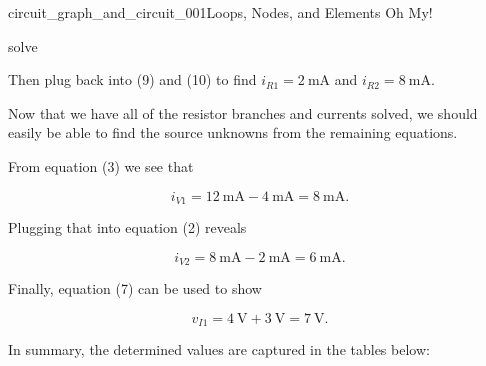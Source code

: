\begin{mainquestion}{circuit_graph_and_circuit_001}{Loops, Nodes, and Elements Oh My!}
\begin{partquestion}{solve}
\begin{answer}
Then plug back into (9) and (10) to find
$i_{R1}=\qty{2}{\milli\ampere}$ and
$i_{R2}=\qty{8}{\milli\ampere}$.

Now that we have all of the resistor branches and currents solved, we should easily be able to find the source unknowns from the remaining equations.

From equation (3) we see that

\[
i_{V1}
=
\qty{12}{\milli\ampere}
-
\qty{4}{\milli\ampere}
=
\qty{8}{\milli\ampere}.
\]

Plugging that into equation (2) reveals

\[
i_{V2}
=
\qty{8}{\milli\ampere}
-
\qty{2}{\milli\ampere}
=
\qty{6}{\milli\ampere}.
\]

Finally, equation (7) can be used to show

\[
v_{I1}
=
\qty{4}{\volt}
+
\qty{3}{\volt}
=
\qty{7}{\volt}.
\]

In summary, the determined values are captured in the tables below:

\begin{table}[htbp]
\centering


\end{table}
\end{answer}
\end{partquestion}
\end{mainquestion}
